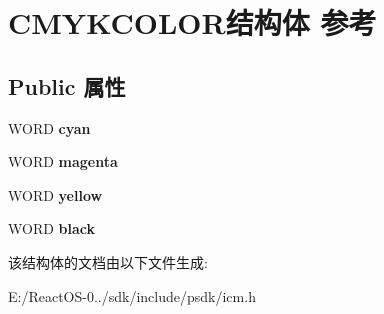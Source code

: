 \hypertarget{struct_c_m_y_k_c_o_l_o_r}{}\section{C\+M\+Y\+K\+C\+O\+L\+O\+R结构体 参考}
\label{struct_c_m_y_k_c_o_l_o_r}
\subsection*{Public 属性}
\begin{DoxyCompactItemize}
\item 
\mbox{\label{struct_c_m_y_k_c_o_l_o_r_aeec6b0ebf169384b9d0b281fc9f23214}} 
W\+O\+RD {\bfseries cyan}
\item 
\mbox{\label{struct_c_m_y_k_c_o_l_o_r_a7f68722431b4fd078ba818560e35e206}} 
W\+O\+RD {\bfseries magenta}
\item 
\mbox{\label{struct_c_m_y_k_c_o_l_o_r_a5a1034fdf135cff7c6f1ea0b381cb914}} 
W\+O\+RD {\bfseries yellow}
\item 
\mbox{\label{struct_c_m_y_k_c_o_l_o_r_a8228606baba3d71fe11bd5cf3cb7beba}} 
W\+O\+RD {\bfseries black}
\end{DoxyCompactItemize}


该结构体的文档由以下文件生成\+:\begin{DoxyCompactItemize}
\item 
E\+:/\+React\+O\+S-\/0../sdk/include/psdk/icm.\+h\end{DoxyCompactItemize}
